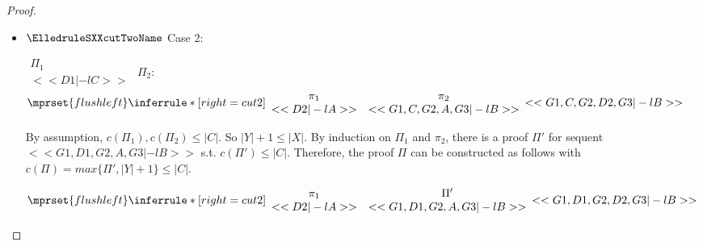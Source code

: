 \begin{proof}
\begin{enumerate}
\begin{itemize}
    \item $\ElledruleSXXcutTwoName$ Case 2:
      \begin{center}
        \scriptsize
        \begin{math}
          \begin{array}{c}
            \Pi_1 \\
            {<<D1 |-l C>>}
          \end{array}
        \end{math}
        \qquad\qquad
        $\Pi_2$:
        \begin{math}
          $$\mprset{flushleft}
          \inferrule* [right={\tiny cut2}] {
            {
              \begin{array}{cc}
                \pi_1 & \pi_2 \\
                {<<D2 |-l A>>} & {<<G1, C, G2, A, G3 |-l B>>}
              \end{array}
            }
          }{<<G1, C, G2, D2, G3 |-l B>>}
        \end{math}
      \end{center}
      By assumption, $c(\Pi_1),c(\Pi_2)\leq |C|$. So $|Y|+1 \leq |X|$. By induction on $\Pi_1$
      and $\pi_2$, there is a proof $\Pi'$ for sequent $<<G1, D1, G2, A, G3 |-l B>>$ s.t.
      $c(\Pi') \leq |C|$. Therefore, the proof $\Pi$ can be constructed as follows with
      $c(\Pi) = max\{\Pi', |Y|+1\} \leq |C|$.
      \begin{center}
        \scriptsize
        \begin{math}
          $$\mprset{flushleft}
          \inferrule* [right={\tiny cut2}] {
            {
              \begin{array}{cc}
                \pi_1 & \Pi' \\
                {<<D2 |-l A>>} & {<<G1, D1, G2, A, G3 |-l B>>}
              \end{array}
            }
          }{<<G1, D1, G2, D2, G3 |-l B>>}
        \end{math}
      \end{center}


\end{itemize}
\end{enumerate}
\end{proof}

